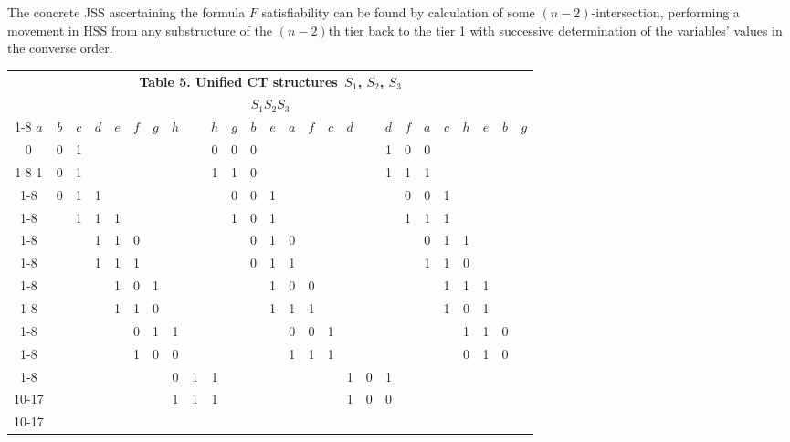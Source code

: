 \documentclass[12pt, a4paper]{article}
\begin{document}
The concrete JSS ascertaining the formula  $F$ satisfiability can be found by calculation of some $(n-2)$-intersection, performing a movement in HSS from any substructure of the $(n-2)$th tier back to the tier 1 with successive determination of the variables' values in the converse order.
\begin{table}[ht]
\begin{tabular}{|c|c|c|c|c|c|c|c|c|c|c|c|c|c|c|c|c|c|c|c|c|c|c|c|c|c|}
\multicolumn{26}{c}{\bf Table 5. Unified CT structures \,$S_1$, $S_2$,  $S_3$}\\
\multicolumn{26}{c}{$S_1$\hspace{5cm}$S_2$\hspace{5cm}$S_3$}\\
\cline{1-8}
\cline{10-17}
\cline{19-26}
$a$&$b$&$c$&$d$&$e$&$f$&$g$&$h$&&$h$&$g$&$b$&$e$&$a$&$f$&$c$&$d$&&
$d$&$f$&$a$&$c$&$h$&$e$&$b$&$g$\\
\hhline{|=|=|=|=|=|=|=|=|~|=|=|=|=|=|=|=|=|~|=|=|=|=|=|=|=|=|}
0&0&1&&&&&& &0&0&0&&&&&& &1&0&0&&&&&\\
\cline{1-8}
\cline{10-17}
\cline{19-26}
1&0&1&&&&&& &1&1&0&&&&&& &1&1&1&&&&&\\
\cline{1-8}
\cline{10-17}
\cline{19-26}
&0&1&1&&&&& &&0&0&1&&&&& &&0&0&1&&&&\\
\cline{1-8}
\cline{10-17}
\cline{19-26}
&&1&1&1&&&& &&1&0&1&&&&& &&1&1&1&&&&\\
\cline{1-8}
\cline{10-17}
\cline{19-26}
&&&1&1&0&&& &&&0&1&0&&&& &&&0&1&1&&&\\
\cline{1-8}
\cline{10-17}
\cline{19-26}
&&&1&1&1&&& &&&0&1&1&&&& &&&1&1&0&&&\\
\cline{1-8}
\cline{10-17}
\cline{19-26}
&&&&1&0&1&& &&&&1&0&0&&& &&&&1&1&1&&\\
\cline{1-8}
\cline{10-17}
\cline{19-26}
&&&&1&1&0&& &&&&1&1&1&&& &&&&1&0&1&&\\
\cline{1-8}
\cline{10-17}
\cline{19-26}
&&&&&0&1&1& &&&&&0&0&1&& &&&&&1&1&0&\\
\cline{1-8}
\cline{10-17}
\cline{19-26}
&&&&&1&0&0& &&&&&1&1&1&& &&&&&0&1&0&\\
\cline{1-8}
\cline{10-17}
\cline{19-26}
\multicolumn{8}{}{}    &&&&&&&0&1&1& &&&&&&1&0&1\\

\cline{10-17}
\cline{19-26}
\multicolumn{8}{}{}    &&&&&&&1&1&1& &&&&&&1&0&0\\
                                                        \cline{10-17}
\cline{19-26}
\end{tabular}
\end{table}
\end{document}
